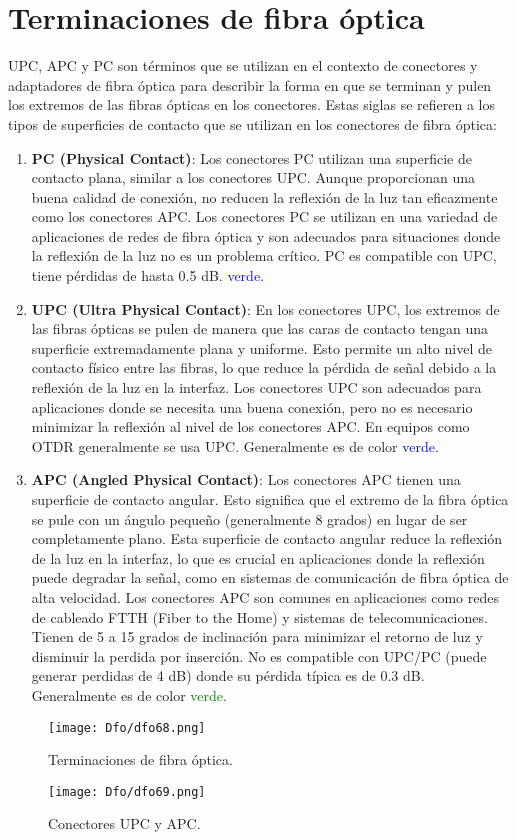 \documentclass[
	12pt, %
	fleqn, %
	a4paper, %
	oneside, %
]{LegrandOrangeBook}
\begin{document}
\section{Terminaciones de fibra óptica}
UPC, APC y PC son términos que se utilizan en el contexto de conectores y adaptadores de fibra óptica para describir la forma en que se terminan y pulen los extremos de las fibras ópticas en los conectores. Estas siglas se refieren a los tipos de superficies de contacto que se utilizan en los conectores de fibra óptica:
\begin{enumerate}
\item \textbf{PC (Physical Contact)}: Los conectores PC utilizan una superficie de contacto plana, similar a los conectores UPC. Aunque proporcionan una buena calidad de conexión, no reducen la reflexión de la luz tan eficazmente como los conectores APC. Los conectores PC se utilizan en una variedad de aplicaciones de redes de fibra óptica y son adecuados para situaciones donde la reflexión de la luz no es un problema crítico. PC es compatible con UPC, tiene pérdidas de hasta 0.5 dB. \textcolor{blue}{verde}.
\item \textbf{UPC (Ultra Physical Contact)}:  En los conectores UPC, los extremos de las fibras ópticas se pulen de manera que las caras de contacto tengan una superficie extremadamente plana y uniforme. Esto permite un alto nivel de contacto físico entre las fibras, lo que reduce la pérdida de señal debido a la reflexión de la luz en la interfaz. Los conectores UPC son adecuados para aplicaciones donde se necesita una buena conexión, pero no es necesario minimizar la reflexión al nivel de los conectores APC. En equipos como OTDR generalmente se usa UPC. Generalmente es de color \textcolor{blue}{verde}.
\item \textbf{APC (Angled Physical Contact)}: Los conectores APC tienen una superficie de contacto angular. Esto significa que el extremo de la fibra óptica se pule con un ángulo pequeño (generalmente 8 grados) en lugar de ser completamente plano. Esta superficie de contacto angular reduce la reflexión de la luz en la interfaz, lo que es crucial en aplicaciones donde la reflexión puede degradar la señal, como en sistemas de comunicación de fibra óptica de alta velocidad. Los conectores APC son comunes en aplicaciones como redes de cableado FTTH (Fiber to the Home) y sistemas de telecomunicaciones. Tienen de 5 a 15 grados de inclinación para minimizar el retorno de luz y disminuir la perdida por inserción. No es compatible con UPC/PC (puede generar perdidas de 4 dB) donde su pérdida típica es de 0.3 dB. Generalmente es de color \textcolor{green}{verde}.
\end{enumerate}
\begin{figure}[H]
\centering
\texttt{[image: Dfo/dfo68.png]}
\caption{Terminaciones de fibra óptica.}
\end{figure}
\begin{figure}[H]
\centering
\texttt{[image: Dfo/dfo69.png]}
\caption{Conectores UPC y APC.}
\end{figure}
\end{document}
